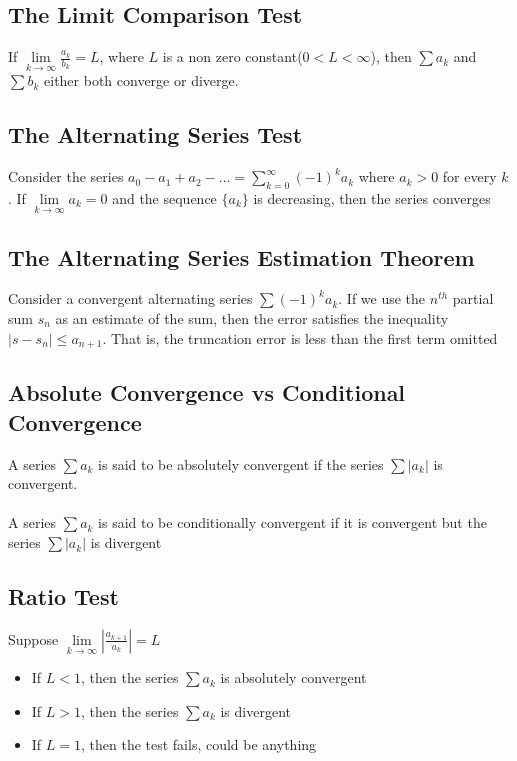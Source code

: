 \documentclass[12pt]{report}
\begin{document}
		\subsection{The Limit Comparison Test}
			If $\lim\limits_{k\rightarrow \infty} \frac{a_k}{b_k} = L$, where $L$ is a non zero constant($0 < L < \infty$), then $\sum a_k$ and $\sum b_k$ either both converge or diverge.
		\subsection{The Alternating Series Test}
			Consider the series $a_0 - a_1 + a_2 -... = \sum_{k=0}^{\infty} (-1)^k a_k$ where $a_k > 0$ for every $k$. If $\lim\limits_{k \rightarrow \infty} a_k = 0$ and the sequence $\{a_k\}$ is decreasing, then the series converges
		\subsection{The Alternating Series Estimation Theorem}
			Consider a convergent alternating series $\sum (-1)^k a_k$. If we use the $n^{th}$ partial sum $s_n$ as an estimate of the sum, then the error satisfies the inequality $|s - s_n| \leq a_{n+1}$. That is, the truncation error is less than the first term omitted
		\subsection{Absolute Convergence vs Conditional Convergence}
			A series $\sum a_k$ is said to be absolutely convergent if the series $\sum |a_k|$ is convergent.\\
			\\
			A series $\sum a_k$ is said to be conditionally convergent if it is convergent but the series $\sum |a_k|$ is divergent
		\subsection{Ratio Test}
			Suppose $\lim\limits_{k\rightarrow \infty} |\frac{a_{k+1}}{a_k}| = L$
			\begin{itemize}
				\item If $L < 1$, then the series $\sum a_k$ is absolutely convergent
				\item If $L > 1$, then the series $\sum a_k$ is divergent
				\item If $L = 1$, then the test fails, could be anything
			\end{itemize}
\end{document}

